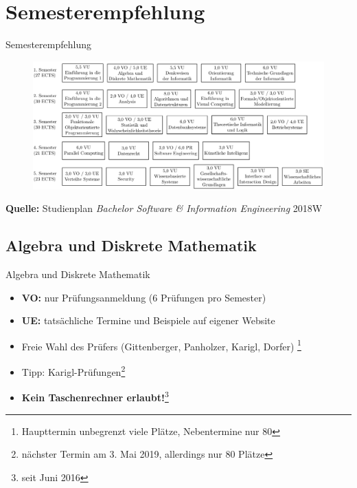\documentclass{beamer}
\begin{document}
\section{Semesterempfehlung}
\begin{frame}{Semesterempfehlung}
    \begin{figure}[htp]
        \centering
        \includegraphics[width=1\textwidth]{semesterempfehlung.png}
    \end{figure}
    \tiny \textbf{Quelle:} Studienplan \textit{Bachelor Software \&
        Information Engineering} 2018W
\end{frame}

\subsection{Algebra und Diskrete Mathematik}
\begin{frame}{Algebra und Diskrete Mathematik}
    \begin{itemize}
        \item \textbf{VO:} nur Prüfungsanmeldung (6 Prüfungen pro Semester)
        \item \textbf{UE:} tatsächliche Termine und Beispiele auf eigener Website
        \item Freie Wahl des Prüfers (Gittenberger, Panholzer, Karigl, Dorfer)
            \footnote{Haupttermin unbegrenzt viele Plätze, Nebentermine nur 80}
        \item Tipp: Karigl-Prüfungen\footnote{nächster Termin am 3. Mai 2019,
            allerdings nur 80 Plätze}
        \item \textbf{Kein Taschenrechner erlaubt!}\footnote{seit Juni 2016}
    \end{itemize}
\end{frame}
\end{document}
